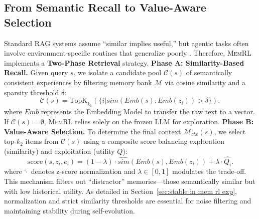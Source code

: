 \documentclass{article}
\theoremstyle{plain}
\theoremstyle{definition}
\theoremstyle{remark}
\begin{document}
\subsection{From Semantic Recall to Value-Aware Selection}
\label{subsec:two_phase}
Standard RAG systems assume ``similar implies useful,'' but agentic tasks often involve environment-specific routines that generalize poorly \citep{singh2025agentic,Cuconasu_2024,gan2024similarity,zhou2024trad}. Therefore, \textsc{MemRL} implements a \textbf{Two-Phase Retrieval} strategy. 
\textbf{Phase A: Similarity-Based Recall.} Given query $s$, we isolate a candidate pool $\mathcal{C}(s)$ of semantically consistent experiences by filtering memory bank $\mathcal{M}$ via cosine similarity and a sparsity threshold $\delta$:
\begin{equation}
\label{eq:phase a}
\mathcal{C}(s) = \text{TopK}_{k_1}(\{i | sim(Emb(s), Emb(z_i)) > \delta\}),
\end{equation}
where $Emb$ represents the Embedding Model to transfer the raw text to a vector.
If $\mathcal{C}(s)=\emptyset$, \textsc{MemRL} relies solely on the frozen LLM for exploration. 
\textbf{Phase B: Value-Aware Selection.} To determine the final context $\mathcal{M}_{ctx}(s)$, we select top-$k_2$ items from $\mathcal{C}(s)$ using a composite score balancing exploration (similarity) and exploitation (utility $Q$):
\begin{equation}
\label{eq:score}
\text{score}(s, z_i, e_i) = (1-\lambda) \cdot \hat{sim}(Emb(s), Emb(z_i)) + \lambda \cdot \hat{Q_i}.
\end{equation}
where $\hat{\cdot}$ denotes z-score normalization and $\lambda \in [0, 1]$ modulates the trade-off. This mechanism filters out ``distractor'' memories—those semantically similar but with low historical utility. As detailed in Section~\ref{sec:stable in mem rl exp}, normalization and strict similarity thresholds are essential for noise filtering and maintaining stability during self-evolution.



\end{document}
